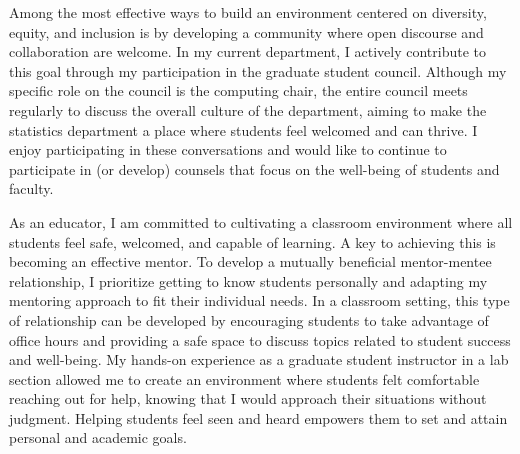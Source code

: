 \documentclass[11pt]{article}
\begin{document}
Among the most effective ways to build an environment centered on diversity, equity, and inclusion is by developing a community where open discourse and collaboration are welcome.
In my current department, I actively contribute to this goal through my participation in the graduate student council.
Although my specific role on the council is the computing chair, the entire council meets regularly to discuss the overall culture of the department, aiming to make the statistics department a place where students feel welcomed and can thrive.
I enjoy participating in these conversations and would like to continue to participate in (or develop) counsels that focus on the well-being of students and faculty.


As an educator, I am committed to cultivating a classroom environment where all students feel safe, welcomed, and capable of learning.
A key to achieving this is becoming an effective mentor.
To develop a mutually beneficial mentor-mentee relationship, I prioritize getting to know students personally and adapting my mentoring approach to fit their individual needs.
In a classroom setting, this type of relationship can be developed by encouraging students to take advantage of office hours and providing a safe space to discuss topics related to student success and well-being.
My hands-on experience as a graduate student instructor in a lab section allowed me to create an environment where students felt comfortable reaching out for help, knowing that I would approach their situations without judgment.
Helping students feel seen and heard empowers them to set and attain personal and academic goals.
\end{document}
